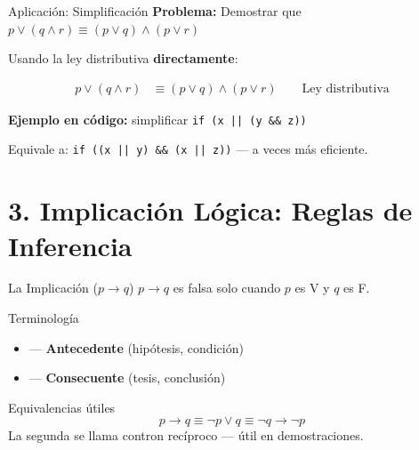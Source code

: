 \documentclass[aspectratio=169,10pt]{beamer}
\begin{document}
\begin{frame}{Aplicación: Simplificación}
\textbf{Problema:} Demostrar que \ $p \lor (q \land r) \equiv (p \lor q) \land (p \lor r)$

\pause
\vspace{0.5em}
Usando la ley distributiva \textbf{directamente}:

\[
\begin{aligned}
p \lor (q \land r) &
\equiv (p \lor q) \land (p \lor r) \qquad \text{Ley distributiva}
\end{aligned}
\]

\pause
\vspace{1em}
\textbf{Ejemplo en código:} simplificar \texttt{if (x || (y \&\& z))}

Equivale a: \texttt{if ((x || y) \&\& (x || z))} — a veces más eficiente.
\end{frame}

\section{3. Implicación Lógica: Reglas de Inferencia}

\begin{frame}{La Implicación ($p \to q$)}
$p \to q$ es \alert{falsa} solo cuando $p$ es V y $q$ es F.

\vspace{1em}
\begin{block}{Terminología}
\begin{itemize}
\item[$p$] --- \textbf{Antecedente} (hipótesis, condición)
\item[$q$] --- \textbf{Consecuente} (tesis, conclusión)
\end{itemize}
\end{block}

\vspace{0.5em}
\begin{block}{Equivalencias útiles}
\[
p \to q \equiv \neg p \lor q \equiv \neg q \to \neg p
\]
La segunda se llama \alert{contron recíproco} — útil en demostraciones.
\end{block}
\end{frame}
\end{document}
